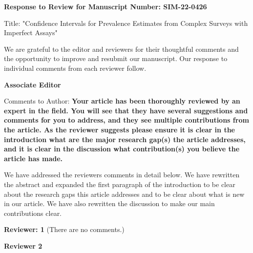 \documentclass[11pt]{article}
\begin{document}
\textbf{Response to Review for Manuscript Number: SIM-22-0426}


Title: "Confidence Intervals for Prevalence Estimates from Complex Surveys with Imperfect Assays"

We are grateful to the editor and reviewers for their thoughtful comments and the opportunity to improve and resubmit our manuscript.
Our response to individual comments from each reviewer follow.



\textbf{ Associate Editor}

Comments to Author:
\textbf{Your article has been thoroughly reviewed by an expert in the field. You will see that they have several suggestions and comments for you to address, and they see multiple contributions from the article.
As the reviewer suggests please ensure it is clear in the introduction what are the major research gap(s) the article addresses, and it is clear in the discussion what contribution(s) you believe the article has made.}

We have addressed the reviewers comments in detail below.
We have rewritten the abstract and expanded the first paragraph of the introduction to be clear about the research gaps this article addresses and to be clear about what is new in our article.
We have also rewritten the discussion to make our main contributions clear. 


\textbf{Reviewer: 1}
(There are no comments.)

\textbf{Reviewer 2}
\end{document}
